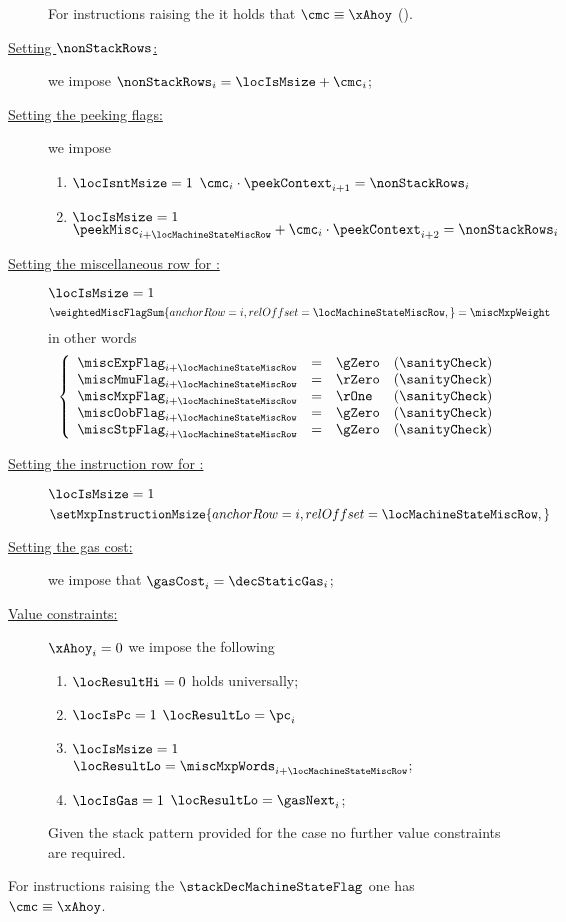 \begin{description}
		\saNote{}
		For instructions raising the \machineStateFlag{} it holds that
		$\cmc \equiv \xAhoy$ (\trash).
	\item[\underline{Setting $\nonStackRows$:}]
		we impose $\nonStackRows_{i} = \locIsMsize + \cmc_{i}$;
	\item[\underline{Setting the peeking flags:}]
		we impose
		\begin{enumerate}
			\item \If $\locIsntMsize = 1$ \Then $\cmc_{i} \cdot \peekContext_{i + 1} = \nonStackRows_{i}$
			\item \If $\locIsMsize   = 1$ \Then $\peekMisc_{i + \locMachineStateMiscRow} + \cmc_{i} \cdot \peekContext_{i + 2} = \nonStackRows_{i}$
		\end{enumerate}
	\item[\underline{Setting the miscellaneous row for \inst{MSIZE}:}]
		\If $\locIsMsize = 1$ \Then
		\[
			\weightedMiscFlagSum {
				anchorRow = i                       ,
				relOffset = \locMachineStateMiscRow ,
			}
			=
			\miscMxpWeight
		\]
		in other words
		\[
			\left\{ \begin{array}{lclr}
				\miscExpFlag_{i + \locMachineStateMiscRow} & = & \gZero  & (\sanityCheck) \\
				\miscMmuFlag_{i + \locMachineStateMiscRow} & = & \rZero  & (\sanityCheck) \\
				\miscMxpFlag_{i + \locMachineStateMiscRow} & = & \rOne   & (\sanityCheck) \\
				\miscOobFlag_{i + \locMachineStateMiscRow} & = & \gZero  & (\sanityCheck) \\
				\miscStpFlag_{i + \locMachineStateMiscRow} & = & \gZero  & (\sanityCheck) \\
			\end{array} \right.
		\]
	\item[\underline{Setting the \mxpMod{} instruction row for \inst{MSIZE}:}]
		\If $\locIsMsize = 1$ \Then
		\[
			\setMxpInstructionMsize {
				anchorRow = i                       ,
				relOffset = \locMachineStateMiscRow ,
			}
		\]
	\item[\underline{Setting the gas cost:}]
		we impose that $\gasCost_{i} = \decStaticGas_{i}$;
	\item[\underline{Value constraints:}]
		\If $\xAhoy_{i} = 0$ \Then we impose the following
		\begin{enumerate}
			\item $\locResultHi = 0$ holds universally;
			\item
				\If $\locIsPc = 1$
				\Then $\locResultLo = \pc_{i}$
			\item
				\If $\locIsMsize = 1$
				\Then $\locResultLo = \miscMxpWords_{i + \locMachineStateMiscRow}$;
			\item
				\If $\locIsGas = 1$
				\Then $\locResultLo = \gasNext_{i}$;
		\end{enumerate}
		\saNote{}
		Given the stack pattern provided for the  case no further value constraints are required.
\end{description}
\saNote{} For instructions raising the $\stackDecMachineStateFlag$ one has $\cmc \equiv \xAhoy$.

